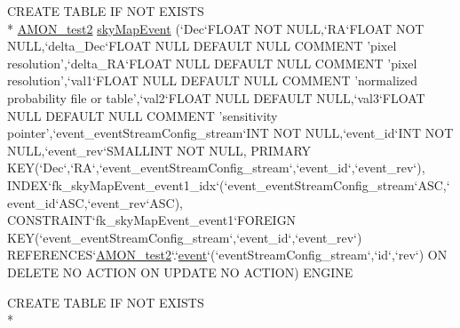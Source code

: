 \begin{DoxyCompactItemize}
\item 
C\-R\-E\-A\-T\-E T\-A\-B\-L\-E I\-F N\-O\-T E\-X\-I\-S\-T\-S \\*
\hyperlink{db__mc__build_8sql_a19c21c59303d8b6591b92240ff7de1d5}{A\-M\-O\-N\-\_\-test2} \hyperlink{db__mc__build_8sql_acd8b55e0fec0e1de0362e4dcb8fa3872}{sky\-Map\-Event} (`Dec`F\-L\-O\-A\-T N\-O\-T N\-U\-L\-L,`R\-A`F\-L\-O\-A\-T N\-O\-T N\-U\-L\-L,`delta\-\_\-\-Dec`F\-L\-O\-A\-T N\-U\-L\-L D\-E\-F\-A\-U\-L\-T N\-U\-L\-L C\-O\-M\-M\-E\-N\-T 'pixel resolution',`delta\-\_\-\-R\-A`F\-L\-O\-A\-T N\-U\-L\-L D\-E\-F\-A\-U\-L\-T N\-U\-L\-L C\-O\-M\-M\-E\-N\-T 'pixel resolution',`val1`F\-L\-O\-A\-T N\-U\-L\-L D\-E\-F\-A\-U\-L\-T N\-U\-L\-L C\-O\-M\-M\-E\-N\-T 'normalized probability file or table',`val2`F\-L\-O\-A\-T N\-U\-L\-L D\-E\-F\-A\-U\-L\-T N\-U\-L\-L,`val3`F\-L\-O\-A\-T N\-U\-L\-L D\-E\-F\-A\-U\-L\-T N\-U\-L\-L C\-O\-M\-M\-E\-N\-T 'sensitivity pointer',`event\-\_\-event\-Stream\-Config\-\_\-stream`I\-N\-T N\-O\-T N\-U\-L\-L,`event\-\_\-id`I\-N\-T N\-O\-T N\-U\-L\-L,`event\-\_\-rev`S\-M\-A\-L\-L\-I\-N\-T N\-O\-T N\-U\-L\-L, P\-R\-I\-M\-A\-R\-Y K\-E\-Y(`Dec`,`R\-A`,`event\-\_\-event\-Stream\-Config\-\_\-stream`,`event\-\_\-id`,`event\-\_\-rev`), I\-N\-D\-E\-X`fk\-\_\-sky\-Map\-Event\-\_\-event1\-\_\-idx`(`event\-\_\-event\-Stream\-Config\-\_\-stream`A\-S\-C,`event\-\_\-id`A\-S\-C,`event\-\_\-rev`A\-S\-C), C\-O\-N\-S\-T\-R\-A\-I\-N\-T`fk\-\_\-sky\-Map\-Event\-\_\-event1`F\-O\-R\-E\-I\-G\-N K\-E\-Y(`event\-\_\-event\-Stream\-Config\-\_\-stream`,`event\-\_\-id`,`event\-\_\-rev`) R\-E\-F\-E\-R\-E\-N\-C\-E\-S`\hyperlink{db__mc__build_8sql_a19c21c59303d8b6591b92240ff7de1d5}{A\-M\-O\-N\-\_\-test2}`.`\hyperlink{db__mc__build_8sql_acbd1fd683d4ac62d62bece4d450f6bb0}{event}`(`event\-Stream\-Config\-\_\-stream`,`id`,`rev`) O\-N D\-E\-L\-E\-T\-E N\-O A\-C\-T\-I\-O\-N O\-N U\-P\-D\-A\-T\-E N\-O A\-C\-T\-I\-O\-N) E\-N\-G\-I\-N\-E
\item 
C\-R\-E\-A\-T\-E T\-A\-B\-L\-E I\-F N\-O\-T E\-X\-I\-S\-T\-S \\*

\end{DoxyCompactItemize}
